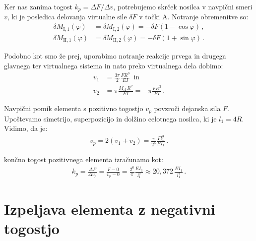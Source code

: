         \newpage
        Ker nas zanima togost $k_p=\Delta F / \Delta v$, potrebujemo skrček nosilca v navpični smeri $v$, ki je posledica delovanja virtualne sile $\delta F$ v točki A. Notranje obremenitve so:
        \begin{align}
            \delta M_{\text{I},1}(\varphi) &= \delta M_{\text{I},2}(\varphi) = -\delta F (1 - \cos\varphi) \nonumber \,,\\
            \delta M_{\text{II},1}(\varphi) &= \delta M_{\text{II},2}(\varphi) = -\delta F (1 + \sin\varphi) \,.
        \end{align}
        
        Podobno kot smo že prej, uporabimo notranje reakcije prvega in drugega glavnega ter virtualnega sistema in nato preko virtualnega dela dobimo:
        \begin{align}
            v_1 &= \frac{3 \pi}{2} \frac{F R^3}{E I} \, \text{ in} \\
            v_2 &= \pi \frac{M_A \, R^2}{E I} = - \pi \frac{F R^3}{E I}  \,.
        \end{align}
        
        Navpični pomik elementa s pozitivno togostjo $v_p$ povzroči dejanska sila $F$. Upoštevamo simetrijo, superpozicijo in dolžino celotnega nosilca, ki je $l_1=4 R$. Vidimo, da je:
        \begin{align}
            v_p = 2 ( v_1 + v_2 ) = \frac{\pi}{2^6} \frac{F l_1^3}{E I_1}  \,.
        \end{align}
        
        končno togost pozitivnega elementa izračunamo kot:
        \begin{align}\label{eq:kp}
            k_p = \frac{\Delta F}{\Delta v_p} = \frac{F-0}{v_p-0} = \frac{2^6}{\pi} \frac{E I_1}{l_1^3} \approx 20,372 \, \frac{E I_1}{l_1^3}\,.
        \end{align}
        
    \section{Izpeljava elementa z negativni togostjo}\label{sec:Izpeljava_elementa_z_negativno_togostjo}
    
